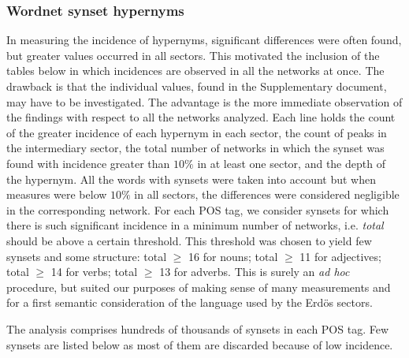 \documentclass[review]{elsarticle}
\begin{document}
\subsubsection{Wordnet synset hypernyms}\label{subsec:wn1}
In measuring the incidence of hypernyms, significant differences were often found, but greater values
occurred in all sectors.
This motivated the inclusion of the tables below in which incidences are observed in all the networks at once.
The drawback is that the individual values, found in the Supplementary document, may have to be investigated.
The advantage is the more immediate observation of the findings with respect to all the networks analyzed.
Each line holds the count of the greater incidence of each hypernym in each sector,
the count of peaks in the intermediary sector, the total number of networks in which the
synset was found with incidence greater than $10\%$ in at least one sector,
and the depth of the hypernym.
All the words with synsets were taken into account but when measures were below $10\%$ in all
sectors, the differences were considered negligible in the corresponding network.
For each POS tag, we consider synsets for which there is such significant incidence in a minimum number of networks,
i.e. \emph{total} should be above a certain threshold.
This threshold was chosen to yield few synsets and some structure:
total $\geq$ 16 for nouns;
total $\geq$ 11 for adjectives;
total $\geq$ 14 for verbs;
total $\geq$ 13 for adverbs.
This is surely an \emph{ad hoc} procedure,
but suited our purposes of making sense of many measurements
and for a first semantic consideration of the language used by the Erd\"os sectors. 

The analysis comprises hundreds of thousands of synsets in each POS tag.
Few synsets are listed below as most of them are discarded because of low incidence. 
\end{document}

